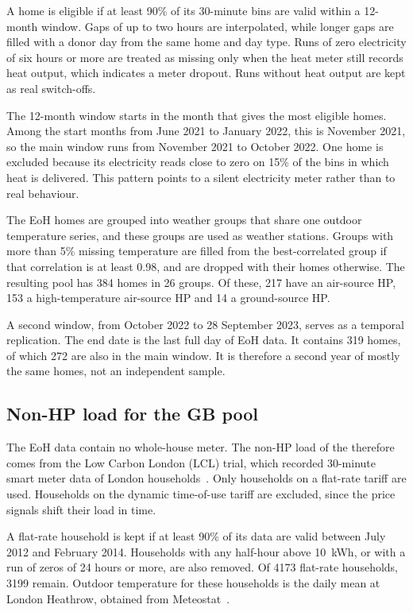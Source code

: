 A home is eligible if at least 90\% of its 30-minute bins are valid within a 12-month window. Gaps of up to two hours are interpolated, while longer gaps are filled with a donor day from the same home and day type. Runs of zero electricity of six hours or more are treated as missing only when the heat meter still records heat output, which indicates a meter dropout. Runs without heat output are kept as real switch-offs.

The 12-month window starts in the month that gives the most eligible homes. Among the start months from June 2021 to January 2022, this is November 2021, so the main window runs from November 2021 to October 2022. One home is excluded because its electricity reads close to zero on 15\% of the bins in which heat is delivered. This pattern points to a silent electricity meter rather than to real behaviour.

The EoH homes are grouped into weather groups that share one outdoor temperature series, and these groups are used as weather stations. Groups with more than 5\% missing temperature are filled from the best-correlated group if that correlation is at least 0.98, and are dropped with their homes otherwise. The resulting pool has 384 homes in 26 groups. Of these, 217 have an air-source HP, 153 a high-temperature air-source HP and 14 a ground-source HP.

A second window, from October 2022 to 28 September 2023, serves as a temporal replication. The end date is the last full day of EoH data. It contains 319 homes, of which 272 are also in the main window. It is therefore a second year of mostly the same homes, not an independent sample.

\subsection{Non-HP load for the GB pool}\label{sec:data-lcl}

The EoH data contain no whole-house meter. The non-HP load of the \poolGB{} therefore comes from the Low Carbon London (LCL) trial, which recorded 30-minute smart meter data of London households~\cite{schofield2015lcl}. Only households on a flat-rate tariff are used. Households on the dynamic time-of-use tariff are excluded, since the price signals shift their load in time.

A flat-rate household is kept if at least 90\% of its data are valid between July 2012 and February 2014. Households with any half-hour above 10~kWh, or with a run of zeros of 24 hours or more, are also removed. Of \num{4173} flat-rate households, \num{3199} remain. Outdoor temperature for these households is the daily mean at London Heathrow, obtained from Meteostat~\cite{meteostat}.

